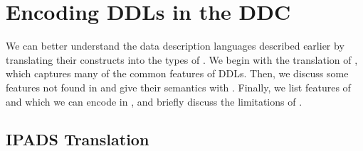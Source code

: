 \section{Encoding DDLs in the DDC}
\label{sec:encodings}

We can better understand the data description languages described
earlier by translating their constructs into the types of \ddc{}. We
begin with the translation of \ipads{}, which captures many of the
common features of DDLs. Then, we discuss some features not found in
\ipads{} and give their semantics with \ddc{}. Finally, we list features
of \datascript{} and \packettypes{} which we can encode in \ddc{},
and briefly discuss the limitations of \ddc{}.

\subsection{IPADS Translation}
\label{sec:trans-sl}

